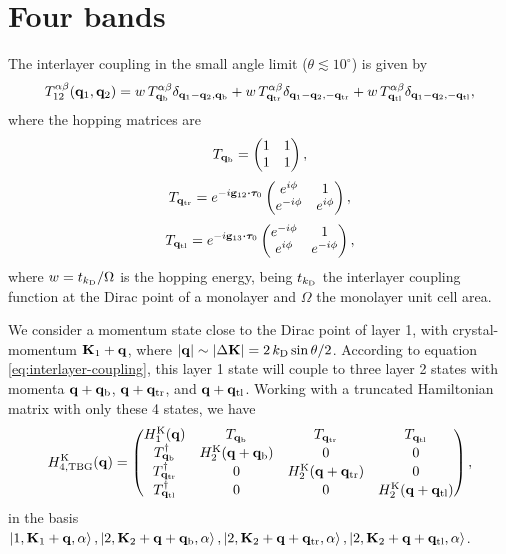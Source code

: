 \documentclass[a4paper,12pt]{article}
\begin{document}
\section{Four bands}

The interlayer coupling in the small angle limit ($\theta \lesssim 10^\circ$) is given by
\begin{equation} \label{eq:interlayer-coupling}
T_{12}^{\alpha\beta}({\vb{q}}_1,{\vb{q}}_2) =
w \, T_{{\vb{q}}_{\text{b}}}^{\alpha\beta} \delta_{{\vb{q}}_1-{\vb{q}}_2,{\vb{q}}_{\text{b}}} +
w \, T_{{\vb{q}}_{\text{tr}}}^{\alpha\beta} \delta_{{\vb{q}}_1-{\vb{q}}_2,-{\vb{q}}_{\text{tr}}} +
w \, T_{{\vb{q}}_{\text{tl}}}^{\alpha\beta} \delta_{{\vb{q}}_1-{\vb{q}}_2,-{\vb{q}}_{\text{tl}}},
\end{equation}
where the hopping matrices are
$$
T_{{\vb{q}}_\text{b}} =
\begin{pmatrix}
1 & 1 \\
1 & 1
\end{pmatrix},
$$
$$
T_{\q_\text{tr}} = e^{-i \g_{12} \vdot \vtau_0}
\begin{pmatrix}
e^{i\phi} & 1 \\
e^{-i\phi} & e^{i\phi}
\end{pmatrix},
$$
$$
T_{\q_\text{tl}} = e^{-i \g_{13} \vdot \vtau_0}
\begin{pmatrix}
e^{-i\phi} & 1 \\
e^{i\phi} & e^{-i\phi}
\end{pmatrix},
$$
where $w = t_{{k_{\text{D}}}}/\Omega$ is the hopping energy, being $t_{k_{\text{D}}}$ the interlayer coupling function at the Dirac point of a monolayer and $\Omega$ the monolayer unit cell area.

\n

We consider a momentum state close to the Dirac point of layer 1, with crystal-momentum ${\vb{K}}_1 + {\vb{q}}$, where $\abs{{\vb{q}}} \sim \abs{\Delta {\vb{K}}} = 2 \, {k_{\text{D}}} \sin\theta/2$. According to equation \ref{eq:interlayer-coupling}, this layer 1 state will couple to three layer 2 states with momenta ${\vb{q}}+{{\vb{q}}_{{\text{b}}}}$, ${\vb{q}}+{{\vb{q}}_{{\text{tr}}}}$, and ${\vb{q}}+{{\vb{q}}_{{\text{tl}}}}$. Working with a truncated Hamiltonian matrix with only these 4 states, we have
$$
H_{4, \text{TBG}}^{\text{K}}({\vb{q}}) =
\begin{pmatrix}
H_1^{\text{K}}({\vb{q}}) & T_{{{\vb{q}}_{{\text{b}}}}} & T_{{{\vb{q}}_{{\text{tr}}}}} & T_{{{\vb{q}}_{{\text{tl}}}}} \\
T_{{{\vb{q}}_{{\text{b}}}}}^{\dagger} & H_2^{\text{K}}({\vb{q}}+{{\vb{q}}_{{\text{b}}}}) & 0 & 0 \\
T_{{{\vb{q}}_{{\text{tr}}}}}^{\dagger} & 0 & H_2^{\text{K}}({\vb{q}}+{{\vb{q}}_{{\text{tr}}}}) & 0 \\
T_{{{\vb{q}}_{{\text{tl}}}}}^{\dagger} & 0 & 0 & H_2^{\text{K}}({\vb{q}}+{{\vb{q}}_{{\text{tl}}}}) \\
\end{pmatrix}
,
$$
in the basis $\ket{1,{\vb{K}}_1+{\vb{q}},\alpha}, \ket{2,{\vb{K}}_2+{\vb{q}}+{{\vb{q}}_{{\text{b}}}},\alpha}, \ket{2,{\vb{K}}_2+{\vb{q}}+{{\vb{q}}_{{\text{tr}}}},\alpha}, \ket{2,{\vb{K}}_2+{\vb{q}}+{{\vb{q}}_{{\text{tl}}}},\alpha}$.

%


\end{document}
